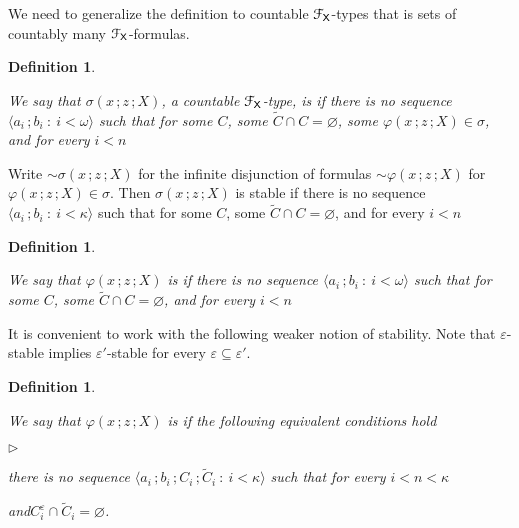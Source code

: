 \documentclass{amsproc}
\newcommand{\mylabel}[1]{{#1}\hfill}
\renewenvironment{itemize}
  {\begin{list}{$\triangleright$}{%
  \setlength{\parskip}{0mm}
  \setlength{\topsep}{.1\baselineskip}
  \setlength{\rightmargin}{0mm}
  \setlength{\listparindent}{0mm}
  \setlength{\itemindent}{0mm}
  \setlength{\labelwidth}{3ex}
  \setlength{\itemsep}{.1\baselineskip}
  \setlength{\parsep}{.1\baselineskip}
  \setlength{\partopsep}{0mm}
  \setlength{\labelsep}{1ex}
  \setlength{\leftmargin}{\labelwidth+\labelsep}
  \let\makelabel\mylabel}}{%
\end{list}}
\newcounter{thm}
\theoremstyle{mio}
\newtheorem{definition}[thm]{Definition}\tcolorboxenvironment{definition}{mythm}
\renewcommand*{\emph}[1]{%
   \smash{\tikz[baseline]\node[rectangle, fill=teal!25, rounded corners, inner xsep=0.5ex, inner ysep=0.2ex, anchor=base, minimum height = 2.7ex]{\strut #1};}}
\begin{document}
We need to generalize the definition to countable ${\EuScript F}_{\sf X}$-types that is sets of countably many ${\EuScript F}_{\sf X}$-formulas.


\begin{definition}\label{def_stable_inf}\strut
  We say that  $\sigma(x\,;z\,;X)$, a countable ${\EuScript F}_{\sf X}$-type, is \emph{stable\/} if there is no sequence $\langle a_i\,;b_i\ :\ i<\omega\rangle$ such that for some $C$, some $\tilde C\cap C=\varnothing$, some $\varphi(x\,;z\,;X)\in\sigma$, and for every $i<n$\smallskip

  \smallskip

\end{definition}

Write ${\sim}\sigma(x\,;z\,;X)$ for the infinite disjunction of formulas ${\sim}\varphi(x\,;z\,;X)$ for  $\varphi(x\,;z\,;X)\in\sigma$.
Then $\sigma(x\,;z\,;X)$ is stable if there is no sequence $\langle a_i\,;b_i\ :\ i<\kappa\rangle$ such that for some $C$, some $\tilde C\cap C=\varnothing$, and for every $i<n$\smallskip

\smallskip


\begin{definition}\label{def_stable_inf}\strut
  We say that $\varphi(x\,;z\,;X)$ is \emph{stable\/} if there is no sequence $\langle a_i\,;b_i\ :\ i<\omega\rangle$ such that for some $C$, some $\tilde C\cap C=\varnothing$, and for every $i<n$\smallskip

  \smallskip

\end{definition}

It is convenient to work with the following weaker notion of stability.
Note that $\varepsilon$-stable implies $\varepsilon'$-stable for every $\varepsilon\subseteq\varepsilon'$.

\begin{definition}\label{def_epsilon_stable}\strut
  We say that $\varphi(x\,;z\,;X)$ is \emph{$\varepsilon$-stable\/} if the following equivalent conditions hold\smallskip
  
  \begin{itemize}
    \item [1.]  there is no sequence $\langle a_i\,;b_i\,;C_i\,;\tilde C_i\ :\ i<\kappa\rangle$ such that for every $i<n<\kappa$\smallskip
  
    \quad and\quad $C_i^\varepsilon\cap\tilde C_i=\varnothing$.\smallskip
  \end{itemize}
\end{definition}
\end{document}
